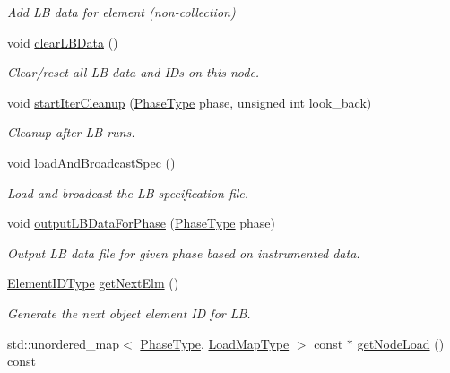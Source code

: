 \begin{DoxyCompactItemize}
\begin{DoxyCompactList}\small\item\em Add LB data for element (non-\/collection) \end{DoxyCompactList}\item 
void \hyperlink{structvt_1_1vrt_1_1collection_1_1balance_1_1_node_l_b_data_aca420505505e0da3efd5388c7212d23d}{clear\+L\+B\+Data} ()
\begin{DoxyCompactList}\small\item\em Clear/reset all LB data and I\+Ds on this node. \end{DoxyCompactList}\item 
void \hyperlink{structvt_1_1vrt_1_1collection_1_1balance_1_1_node_l_b_data_aa12774fb241886e1995115af7d310564}{start\+Iter\+Cleanup} (\hyperlink{namespacevt_a46ce6733d5cdbd735d561b7b4029f6d7}{Phase\+Type} phase, unsigned int look\+\_\+back)
\begin{DoxyCompactList}\small\item\em Cleanup after LB runs. \end{DoxyCompactList}\item 
void \hyperlink{structvt_1_1vrt_1_1collection_1_1balance_1_1_node_l_b_data_ace5a540d8a81e8530ba38cb63580fbb9}{load\+And\+Broadcast\+Spec} ()
\begin{DoxyCompactList}\small\item\em Load and broadcast the LB specification file. \end{DoxyCompactList}\item 
void \hyperlink{structvt_1_1vrt_1_1collection_1_1balance_1_1_node_l_b_data_ac3a71fde943f97688823f4dee9e87185}{output\+L\+B\+Data\+For\+Phase} (\hyperlink{namespacevt_a46ce6733d5cdbd735d561b7b4029f6d7}{Phase\+Type} phase)
\begin{DoxyCompactList}\small\item\em Output LB data file for given phase based on instrumented data. \end{DoxyCompactList}\item 
\hyperlink{namespacevt_1_1vrt_1_1collection_1_1balance_a592736f733df4f90856df90a1fd08905}{Element\+I\+D\+Type} \hyperlink{structvt_1_1vrt_1_1collection_1_1balance_1_1_node_l_b_data_a6802b9deda54d1b96280bff0431deab5}{get\+Next\+Elm} ()
\begin{DoxyCompactList}\small\item\em Generate the next object element ID for LB. \end{DoxyCompactList}\item 
std\+::unordered\+\_\+map$<$ \hyperlink{namespacevt_a46ce6733d5cdbd735d561b7b4029f6d7}{Phase\+Type}, \hyperlink{namespacevt_1_1vrt_1_1collection_1_1balance_a5339303db2e1ce964d783a53fd74e6b1}{Load\+Map\+Type} $>$ const  $\ast$ \hyperlink{structvt_1_1vrt_1_1collection_1_1balance_1_1_node_l_b_data_a6a1d3d7f8ae930f1d5f97fafc91e118c}{get\+Node\+Load} () const

\end{DoxyCompactItemize}
